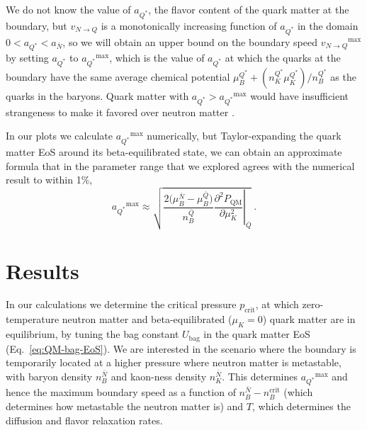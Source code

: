 \documentclass[10pt,superscriptaddress,
amsmath,aps,prl,twocolumn,nofootinbib]{revtex4-1}
\newcommand{\JS}[1]{{\color{violet}#1}}
\newcommand{\JScom}[1]{\textsf{\color{violet} [\textsuperscript{JS}#1]}}
\newcommand{\aQstar}{\ensuremath{a_{Q^*}}}
\newcommand{\vb}{\ensuremath{v_{N\to Q}}}
\newcommand{\Nbar}{{\ensuremath{\bar N}}}
\newcommand{\Qbar}{{\ensuremath{\bar Q}}}
\begin{document}
We do not know the value of $\aQstar$, the flavor content of the quark matter at the boundary, but $\vb$ is a monotonically increasing function of $\aQstar$ \JS{in the domain $0<\aQstar<a_\Nbar$}, so we will obtain an upper bound on the boundary speed $\vb^\text{max}$ by setting $\aQstar$ to $\aQstar^\text{max}$, which is the value of $\aQstar$ at which the quarks at the boundary have the same average chemical potential $\mu_{B}^{Q^*} + (n_K^{Q^*}\mu_K^{Q^*})/n_B^{Q^*}$ as the quarks in the baryons. 
Quark matter with $\aQstar>\aQstar^\text{max}$ would have insufficient strangeness to make it favored over neutron matter \cite{Alford:2014jha}. 

In our plots we calculate $\aQstar^{\text{max}}$ numerically, but
Taylor-expanding the quark matter EoS around its beta-equilibrated state, we can obtain an approximate formula that in the parameter range that we explored agrees with the numerical result to within 1\%,
\begin{equation}
\aQstar^{\mathrm{max}} \approx \sqrt{ \dfrac{2 \bigl(\mu_B^\Nbar - \mu_B^\Qbar\bigr)}{n_B^\Qbar}\left. \dfrac{\partial^2 P_\text{QM}}{\partial\mu_K^2}\right|_{\Qbar}} \ .
\label{eq:aQmax}
\end{equation}



\section{Results}



In our calculations we determine the critical pressure $p_\text{crit}$, at which zero-temperature neutron matter 
and beta-equilibrated ($\mu_K=0$)  quark matter are in equilibrium,  by tuning the bag constant $U_\text{bag}$ in the quark matter EoS (Eq.~\eqref{eq:QM-bag-EoS}).
We are interested in the scenario where the boundary is temporarily located at a higher pressure where neutron matter is metastable, with baryon density $n_B^\Nbar$  and kaon-ness density $n_K^\Nbar$. This determines $\aQstar^\text{max}$ and hence the maximum boundary speed as a function of $n_B^\Nbar-n_B^\text{crit}$ (which determines how metastable the neutron matter is) and $T$, which determines the diffusion and flavor relaxation rates.
\end{document}
